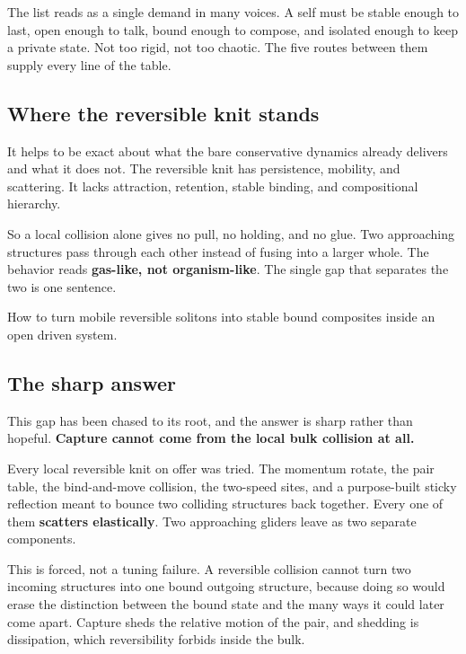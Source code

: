 The list reads as a single demand in many voices. A self must be stable enough to last, open enough to talk, bound enough to compose, and isolated enough to keep a private state. Not too rigid, not too chaotic. The five routes between them supply every line of the table.

\subsection{Where the reversible knit stands}

It helps to be exact about what the bare conservative dynamics already delivers and what it does not. The reversible knit has persistence, mobility, and scattering. It lacks attraction, retention, stable binding, and compositional hierarchy.

So a local collision alone gives no pull, no holding, and no glue. Two approaching structures pass through each other instead of fusing into a larger whole. The behavior reads \textbf{gas-like, not organism-like}. The single gap that separates the two is one sentence.

\begin{principle}
How to turn mobile reversible solitons into stable bound composites inside an open driven system.
\end{principle}

\subsection{The sharp answer}

This gap has been chased to its root, and the answer is sharp rather than hopeful. \textbf{Capture cannot come from the local bulk collision at all.}

Every local reversible knit on offer was tried. The momentum rotate, the pair table, the bind-and-move collision, the two-speed sites, and a purpose-built sticky reflection meant to bounce two colliding structures back together. Every one of them \textbf{scatters elastically}. Two approaching gliders leave as two separate components.

This is forced, not a tuning failure. A reversible collision cannot turn two incoming structures into one bound outgoing structure, because doing so would erase the distinction between the bound state and the many ways it could later come apart. Capture sheds the relative motion of the pair, and shedding is dissipation, which reversibility forbids inside the bulk.

